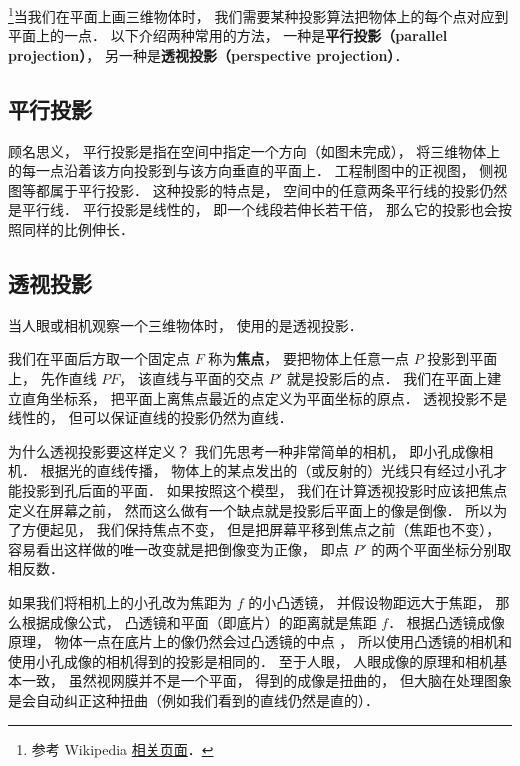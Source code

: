 
\begin{issues}
\issueTODO
\end{issues}

\footnote{参考 Wikipedia \href{https://en.wikipedia.org/wiki/3D_projection}{相关页面}．}当我们在平面上画三维物体时， 我们需要某种投影算法把物体上的每个点对应到平面上的一点． 以下介绍两种常用的方法， 一种是\textbf{平行投影（parallel projection）}， 另一种是\textbf{透视投影（perspective projection）}．


\subsection{平行投影}
顾名思义， 平行投影是指在空间中指定一个方向（如图未完成）， 将三维物体上的每一点沿着该方向投影到与该方向垂直的平面上． 工程制图中的正视图， 侧视图等都属于平行投影． 这种投影的特点是， 空间中的任意两条平行线的投影仍然是平行线． 平行投影是线性的， 即一个线段若伸长若干倍， 那么它的投影也会按照同样的比例伸长．

\subsection{透视投影}
当人眼或相机观察一个三维物体时， 使用的是透视投影．


我们在平面后方取一个固定点 $F$ 称为\textbf{焦点}， 要把物体上任意一点 $P$ 投影到平面上， 先作直线 $PF$， 该直线与平面的交点 $P'$ 就是投影后的点． 我们在平面上建立直角坐标系， 把平面上离焦点最近的点定义为平面坐标的原点． 透视投影不是线性的， 但可以保证直线的投影仍然为直线．

为什么透视投影要这样定义？ 我们先思考一种非常简单的相机， 即小孔成像相机． 根据光的直线传播， 物体上的某点发出的（或反射的）光线只有经过小孔才能投影到孔后面的平面． 如果按照这个模型， 我们在计算透视投影时应该把焦点定义在屏幕之前， 然而这么做有一个缺点就是投影后平面上的像是倒像． 所以为了方便起见， 我们保持焦点不变， 但是把屏幕平移到焦点之前（焦距也不变）， 容易看出这样做的唯一改变就是把倒像变为正像， 即点 $P'$ 的两个平面坐标分别取相反数． %

如果我们将相机上的小孔改为焦距为 $f$ 的小凸透镜， 并假设物距远大于焦距， 那么根据成像公式， 凸透镜和平面（即底片）的距离就是焦距 $f$． 根据凸透镜成像原理， 物体一点在底片上的像仍然会过凸透镜的中点%
， 所以使用凸透镜的相机和使用小孔成像的相机得到的投影是相同的． 至于人眼， 人眼成像的原理和相机基本一致， 虽然视网膜并不是一个平面， 得到的成像是扭曲的， 但大脑在处理图象是会自动纠正这种扭曲（例如我们看到的直线仍然是直的）．

